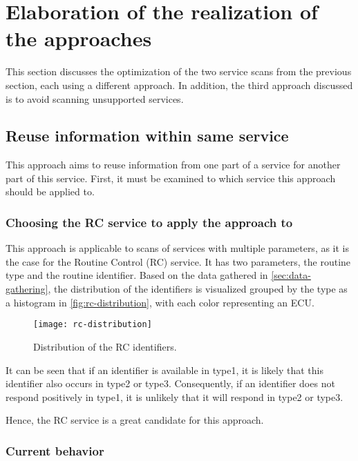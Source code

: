 \chapter{Elaboration of the realization of the approaches}

This section discusses the optimization of the two service scans from the previous section, each using a different approach. In addition, the third approach discussed is to avoid scanning unsupported services.

\section{Reuse information within same service}

This approach aims to reuse information from one part of a service for another part of this service. First, it must be examined to which service this approach should be applied to.

\subsection{Choosing the RC service to apply the approach to}

This approach is applicable to scans of services with multiple parameters, as it is the case for the Routine Control (RC) service. It has two parameters, the routine type and the routine identifier. Based on the data gathered in \autoref{sec:data-gathering}, the distribution of the identifiers is visualized grouped by the type as a histogram in \autoref{fig:rc-distribution}, with each color representing an ECU.

\begin{figure}[htb]
    \centering
    \texttt{[image: rc-distribution]}
    \caption{Distribution of the RC identifiers.}
    \label{fig:rc-distribution}
\end{figure}

It can be seen that if an identifier is available in type1, it is likely that this identifier also occurs in type2 or type3. Consequently, if an identifier does not respond positively in type1, it is unlikely that it will respond in type2 or type3.

Hence, the RC service is a great candidate for this approach.

\subsection{Current behavior}

